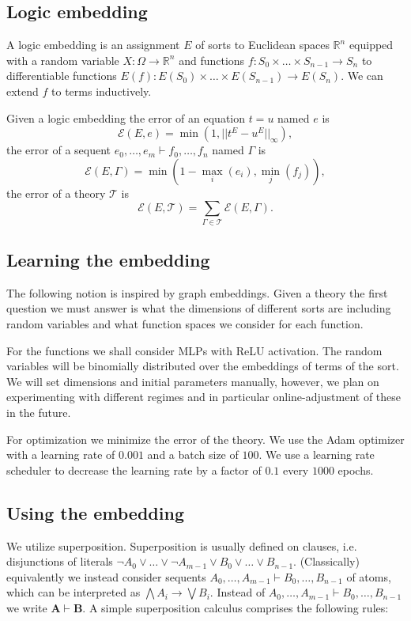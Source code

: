 \documentclass[11pt]{article}
\theoremstyle{definition}
\theoremstyle{definition}
\theoremstyle{definition}
\theoremstyle{definition}
\theoremstyle{definition}
\theoremstyle{definition}
\theoremstyle{definition}
\newcommand{\R}{\mathbb{R}}
\newcommand{\E}{\mathcal{E}}
\newcommand{\A}{\mathbf A}
\newcommand{\B}{\mathbf B}
\begin{document}
    \subsection{Logic embedding}

    A logic embedding is an assignment $E$ of sorts to Euclidean spaces $\R^n$ equipped with a random variable $X: \Omega\to \R^n$ and functions $f: S_0\times\dots\times S_{n-1}\to S_n$ to differentiable functions $E(f):E(S_0)\times\dots\times E(S_{n-1})\to E(S_n)$. We can extend $f$ to terms inductively.

    Given a logic embedding the error of an equation $t = u$ named $e$ is
    $$\E(E, e) = \min(1, ||t^E - u^E||_\infty),$$
    the error of a sequent
    $e_0,\dots, e_m\vdash f_0,\dots,f_n$
    named $\Gamma$ is $$\E(E, \Gamma) = \min                           \left(1 - \max_i(e_i), \min_j\left(f_j\right)\right),$$
    the error of a theory $\mathcal{T}$ is $$\E(E, \mathcal{T}) = \sum_{\Gamma\in\mathcal{T}}\E(E, \Gamma).$$

	\subsection{Learning the embedding}

	The following notion is inspired by graph embeddings. Given a theory the first question we must answer is what the dimensions of different sorts are including random variables and what function spaces we consider for each function.

	For the functions we shall consider MLPs with ReLU activation. The random variables will be binomially distributed over the embeddings of terms of the sort. We will set dimensions and initial parameters manually, however, we plan on experimenting with different regimes and in particular online-adjustment of these in the future.

	For optimization we minimize the error of the theory. We use the Adam optimizer with a learning rate of $0.001$ and a batch size of $100$. We use a learning rate scheduler to decrease the learning rate by a factor of $0.1$ every $1000$ epochs.

    \subsection{Using the embedding}

    We  utilize superposition. Superposition is usually defined on clauses, i.e. disjunctions of literals $\neg A_0\vee\dots\vee\neg A_{m-1}\vee B_0\vee\dots\vee B_{n-1}$. (Classically) equivalently we instead consider sequents $A_0,\dots,A_{m-1}\vdash B_0,\dots,B_{n-1}$ of atoms, which can be interpreted as $\bigwedge A_i\to \bigvee B_i$. Instead of  $A_0,\dots,A_{m-1}\vdash B_0,\dots,B_{n-1}$ we write $\A\vdash \B$. A simple superposition calculus comprises the following rules:
	
\end{document}
